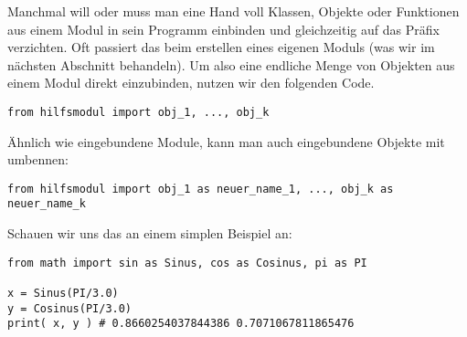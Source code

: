 Manchmal will oder muss man eine Hand voll Klassen, Objekte oder Funktionen aus einem Modul  in sein Programm einbinden und gleichzeitig auf das Präfix  verzichten.
Oft passiert das beim erstellen eines eigenen Moduls (was wir im nächsten Abschnitt behandeln).
Um also eine endliche Menge von Objekten  aus einem Modul  direkt einzubinden, nutzen wir den folgenden Code.
\begin{lstlisting}
from hilfsmodul import obj_1, ..., obj_k
\end{lstlisting}
Ähnlich wie eingebundene Module, kann man auch eingebundene Objekte mit  umbennen:
\begin{lstlisting}
from hilfsmodul import obj_1 as neuer_name_1, ..., obj_k as neuer_name_k
\end{lstlisting}
Schauen wir uns das an einem simplen Beispiel an:
\begin{lstlisting}
from math import sin as Sinus, cos as Cosinus, pi as PI

x = Sinus(PI/3.0)
y = Cosinus(PI/3.0)
print( x, y ) # 0.8660254037844386 0.7071067811865476
\end{lstlisting}




